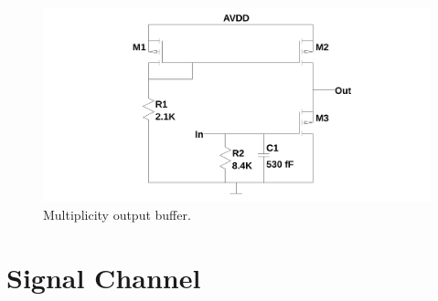 \documentclass[12pt,oneside,final]{siuethesis}
\theoremstyle{definition}
\begin{document}
\begin{figure}[htbp!]
\centering
\includegraphics[scale=.3,keepaspectratio=true]{../LTspice_Drawings/multiplicity/mult_buffer.png} 
\caption{Multiplicity output buffer.}
\label{fig:mult}
\end{figure}


\section{Signal Channel}
\end{document}
